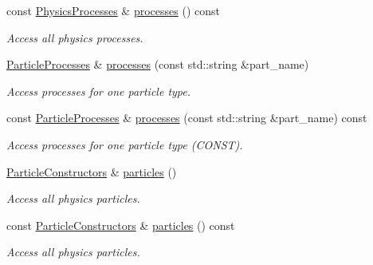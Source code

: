 \begin{DoxyCompactItemize}
const \hyperlink{class_d_d4hep_1_1_simulation_1_1_geant4_physics_list_ab41e55687c9d57878fe2e6847a31f19a}{PhysicsProcesses} \& \hyperlink{class_d_d4hep_1_1_simulation_1_1_geant4_physics_list_ae57b43dcb9dcc62d3fe83764a4956f5c}{processes} () const 
\begin{DoxyCompactList}\small\item\em Access all physics processes. \item\end{DoxyCompactList}\item 
\hyperlink{class_d_d4hep_1_1_simulation_1_1_geant4_physics_list_adf5c4ae6ed4befac883cf5f253f4220e}{ParticleProcesses} \& \hyperlink{class_d_d4hep_1_1_simulation_1_1_geant4_physics_list_a5ab9bb1ab768d100453ab9fa528be067}{processes} (const std::string \&part\_\-name)
\begin{DoxyCompactList}\small\item\em Access processes for one particle type. \item\end{DoxyCompactList}\item 
const \hyperlink{class_d_d4hep_1_1_simulation_1_1_geant4_physics_list_adf5c4ae6ed4befac883cf5f253f4220e}{ParticleProcesses} \& \hyperlink{class_d_d4hep_1_1_simulation_1_1_geant4_physics_list_a04db5f0353e6f8188c8c2a3e21396a3d}{processes} (const std::string \&part\_\-name) const 
\begin{DoxyCompactList}\small\item\em Access processes for one particle type (CONST). \item\end{DoxyCompactList}\item 
\hyperlink{class_d_d4hep_1_1_simulation_1_1_geant4_physics_list_afaee3763aea79b299830be37f9642342}{ParticleConstructors} \& \hyperlink{class_d_d4hep_1_1_simulation_1_1_geant4_physics_list_a273a6db05b6ea5a2b9a8a2491fbd2d7a}{particles} ()
\begin{DoxyCompactList}\small\item\em Access all physics particles. \item\end{DoxyCompactList}\item 
const \hyperlink{class_d_d4hep_1_1_simulation_1_1_geant4_physics_list_afaee3763aea79b299830be37f9642342}{ParticleConstructors} \& \hyperlink{class_d_d4hep_1_1_simulation_1_1_geant4_physics_list_aa145cac6ebeb2a51d34df83762f612e1}{particles} () const 
\begin{DoxyCompactList}\small\item\em Access all physics particles. \item\end{DoxyCompactList}\item 

\end{DoxyCompactItemize}
